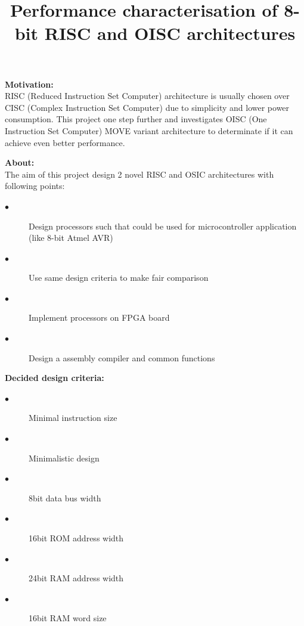 \documentclass[portrait,color=UCLmidgreen,margin=1.5cm,bannerheight=8cm,logoheight=2.5cm]{uclposter}
\title{Performance characterisation of 8-bit RISC and OISC architectures}
\begin{document}

\maketitle
{}
\newcommand{\strutm}{\rule[-.15\baselineskip]{0pt}{\baselineskip}}

\begin{tcolorbox}[title=Introduction]
	\begin{Row}\begin{Cell}{2}
	\textbf{Motivation:}\\
	RISC (Reduced Instruction Set Computer) architecture is usually chosen over CISC (Complex Instruction Set Computer) due to simplicity and lower power consumption. This project one step further and investigates OISC (One Instruction Set Computer) MOVE variant architecture to determinate if it can achieve even better performance.
	\end{Cell}\begin{Cell}{2}
	\textbf{About:}\\
	The aim of this project design 2 novel RISC and OSIC architectures with following points:
	\begin{description}
		\item[$\bullet$] Design processors such that could be used for microcontroller application (like 8-bit Atmel AVR)
		\item[$\bullet$] Use same design criteria to make fair comparison
		\item[$\bullet$] Implement processors on FPGA board
		\item[$\bullet$] Design a assembly compiler and common functions
	\end{description} 
	\end{Cell}\begin{Cell}{1}
	\textbf{Decided design criteria:}
	\begin{description}
		\item[$\bullet$] Minimal instruction size
		\item[$\bullet$] Minimalistic design
		\item[$\bullet$] 8bit data bus width
		\item[$\bullet$] 16bit ROM address width
		\item[$\bullet$] 24bit RAM address width
		\item[$\bullet$] 16bit RAM word size
	\end{description}
	\end{Cell}\end{Row}
\end{tcolorbox}
\end{document}
